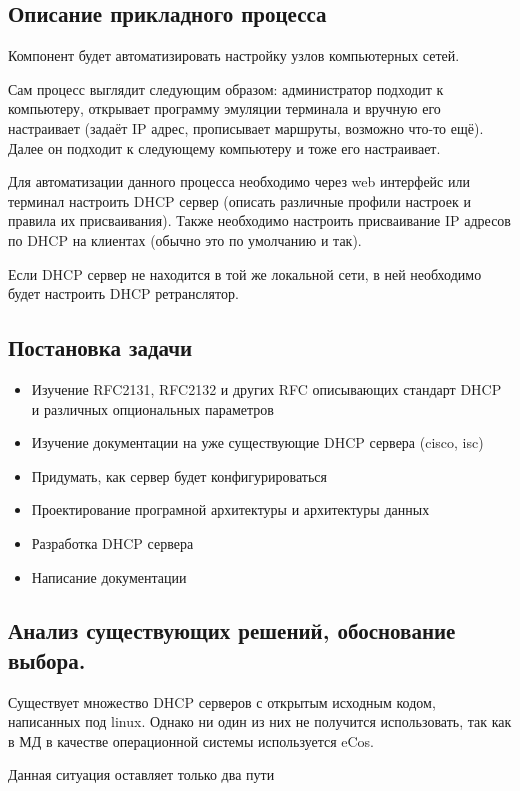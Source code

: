 \documentclass[12pt]{article}
\begin{document}
\subsection{Описание прикладного процесса}
Компонент будет автоматизировать настройку узлов компьютерных сетей.

Сам процесс выглядит следующим образом:
администратор подходит к компьютеру, открывает программу эмуляции терминала и вручную его настраивает (задаёт IP адрес, прописывает маршруты, возможно что-то ещё). Далее он подходит к следующему компьютеру и тоже его настраивает.

Для автоматизации данного процесса необходимо через web интерфейс или терминал настроить DHCP сервер (описать различные профили настроек и правила их присваивания). Также необходимо настроить присваивание IP адресов по DHCP на клиентах (обычно это по умолчанию и так).

Если DHCP сервер не находится в той же локальной сети, в ней необходимо будет настроить DHCP ретранслятор.

\subsection{Постановка задачи}

\begin{itemize}
    \item Изучение RFC2131, RFC2132 и других RFC описывающих стандарт DHCP и различных опциональных параметров
    \item Изучение документации на уже существующие DHCP сервера (cisco, isc)
    \item Придумать, как сервер будет конфигурироваться
    \item Проектирование програмной архитектуры и архитектуры данных
    \item Разработка DHCP сервера
    \item Написание документации
\end{itemize}

\subsection{Анализ существующих решений, обоснование выбора.}

Существует множество DHCP серверов с открытым исходным кодом, написанных под linux.
Однако ни один из них не получится использовать, так как в МД в качестве операционной системы используется eCos.

Данная ситуация оставляет только два пути
\end{document}
